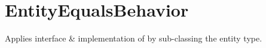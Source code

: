 \section{EntityEqualsBehavior}
\label{feature:EntityEqualsBehavior}
\ClearAPI
Applies interface \& implementation of  by sub-classing the entity type.
\TODO